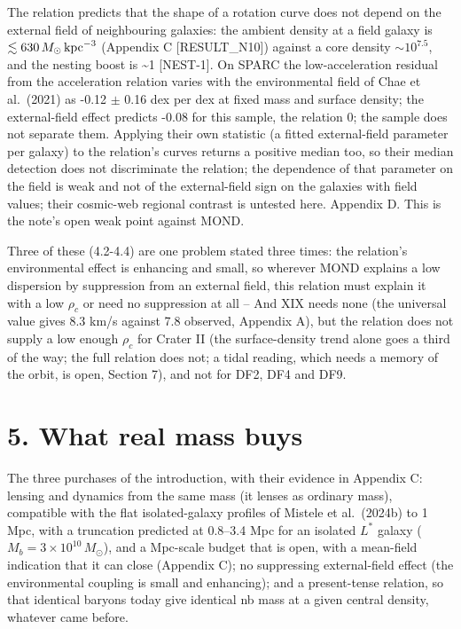 \documentclass[
  10pt,
]{article}
\begin{document}
The relation predicts that the shape of a rotation curve
does not depend on the external field of neighbouring galaxies: the ambient density at a field galaxy is $\lesssim630\,M_\odot\,{\rm kpc}^{-3}$ (Appendix C {[}RESULT\_N10{]}) against a core density
$\sim 10^{7.5}$, and the nesting boost is \textasciitilde{}1
{[}NEST-1{]}. On SPARC the low-acceleration residual from the
acceleration relation varies with the environmental field of Chae et
al.~(2021) as -0.12 $\pm$ 0.16 dex per dex at fixed mass and surface
density; the external-field effect predicts -0.08 for this sample, the
relation 0; the sample does not separate them. Applying their own statistic
(a fitted external-field parameter per galaxy) to the relation's curves
returns a positive median too, so their median detection does not
discriminate the relation; the dependence of that parameter on the field is
weak and not of the external-field sign on the galaxies with field
values; their cosmic-web regional contrast is untested here. Appendix D.
This is the note's open weak point against MOND.

Three of these (4.2-4.4) are one problem stated three times: the relation's
environmental effect is enhancing and small, so wherever MOND explains a
low dispersion by suppression from an external field, this relation must
explain it with a low $\rho_c$ or need no suppression at all -- And XIX needs none (the universal value gives 8.3 km/s against 7.8 observed, Appendix A), but the relation does not supply a low enough $\rho_c$ for
Crater II (the surface-density trend alone goes a third of the way; the full relation does not; a tidal reading, which needs a memory of the orbit, is open, Section 7), and not for DF2, DF4 and DF9.

\section{5. What real mass buys}\label{what-real-mass-buys}

The three purchases of the introduction, with their evidence in Appendix
C: lensing and dynamics from the same mass (it lenses as ordinary mass),
compatible with the flat isolated-galaxy profiles of Mistele et al.~(2024b) to 1 Mpc, with a truncation predicted at 0.8--3.4 Mpc for an isolated $L^*$ galaxy ($M_b=3\times10^{10}\,M_\odot$), and a Mpc-scale budget that is open, with a mean-field indication that it can close (Appendix C);
no suppressing external-field effect (the environmental coupling is
small and enhancing); and a present-tense relation, so that identical baryons
today give identical nb mass at a given central density, whatever came before.
\end{document}
